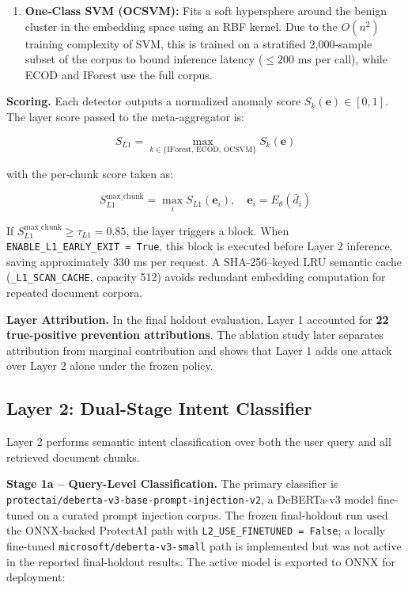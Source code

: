 \documentclass[conference]{IEEEtran}
\begin{document}
\begin{enumerate}
\item \textbf{One-Class SVM (OCSVM):} Fits a soft hypersphere around the benign cluster in the embedding space using an RBF kernel. Due to the $O(n^2)$ training complexity of SVM, this is trained on a stratified 2,000-sample subset of the corpus to bound inference latency ($\leq 200$ ms per call), while ECOD and IForest use the full corpus.
\end{enumerate}

\textbf{Scoring.} Each detector outputs a normalized anomaly score $S_k(\mathbf{e}) \in [0, 1]$. The layer score passed to the meta-aggregator is:


$$S_{L1} = \max_{k \in \{\text{IForest, ECOD, OCSVM}\}} S_k(\mathbf{e})$$


with the per-chunk score taken as:


$$S_{L1}^{\text{max\_chunk}} = \max_{i} S_{L1}(\mathbf{e}_i), \quad \mathbf{e}_i = E_\theta(\bar{d}_i)$$


If $S_{L1}^{\text{max\_chunk}} \geq \tau_{L1} = 0.85$, the layer triggers a block. When \texttt{ENABLE\_L1\_EARLY\_EXIT = True}, this block is executed before Layer 2 inference, saving approximately 330 ms per request. A SHA-256--keyed LRU semantic cache (\texttt{\_L1\_SCAN\_CACHE}, capacity 512) avoids redundant embedding computation for repeated document corpora.


\textbf{Layer Attribution.} In the final holdout evaluation, Layer 1 accounted for \textbf{22 true-positive prevention attributions}. The ablation study later separates attribution from marginal contribution and shows that Layer 1 adds one attack over Layer 2 alone under the frozen policy.


\subsection{Layer 2: Dual-Stage Intent Classifier}

Layer 2 performs semantic intent classification over both the user query and all retrieved document chunks.


\textbf{Stage 1a -- Query-Level Classification.} The primary classifier is \texttt{protectai/deberta-v3-base-prompt-injection-v2}, a DeBERTa-v3 model fine-tuned on a curated prompt injection corpus. The frozen final-holdout run used the ONNX-backed ProtectAI path with \texttt{L2\_USE\_FINETUNED = False}; a locally fine-tuned \texttt{microsoft/deberta-v3-small} path is implemented but was not active in the reported final-holdout results. The active model is exported to ONNX for deployment:
\end{document}
